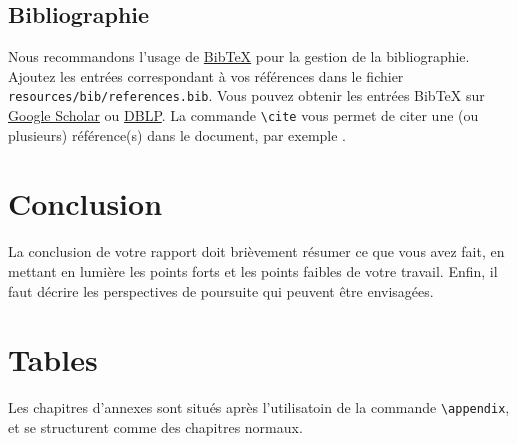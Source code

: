 \documentclass[a4paper, 12pt]{report}
\begin{document}
    \section{Bibliographie}

Nous recommandons l'usage de \href{https://fr.wikipedia.org/wiki/BibTeX}{BibTeX} pour la gestion de la bibliographie. Ajoutez les entrées correspondant à vos références dans le fichier \verb+resources/bib/references.bib+. Vous pouvez obtenir les entrées BibTeX sur \href{https://scholar.google.com}{Google Scholar} ou \href{https://dblp.uni-trier.de}{DBLP}. La commande \verb+\cite+ vous permet de citer une (ou plusieurs) référence(s) dans le document, par exemple \cite{pakin2020comprehensive,RusselNorvig}.

\chapter{Conclusion}
La conclusion de votre rapport doit brièvement résumer ce que vous avez fait, en mettant en lumière les points forts et les points faibles de votre travail. Enfin, il faut décrire les perspectives de poursuite qui peuvent être envisagées.

    \printbibliography[heading=bibintoc,title={Références}]

    \appendix

    \chapter{Tables}
    Les chapitres d'annexes sont situés après l'utilisatoin de la commande \verb+\appendix+, et se structurent comme des chapitres normaux.
    
\end{document}
